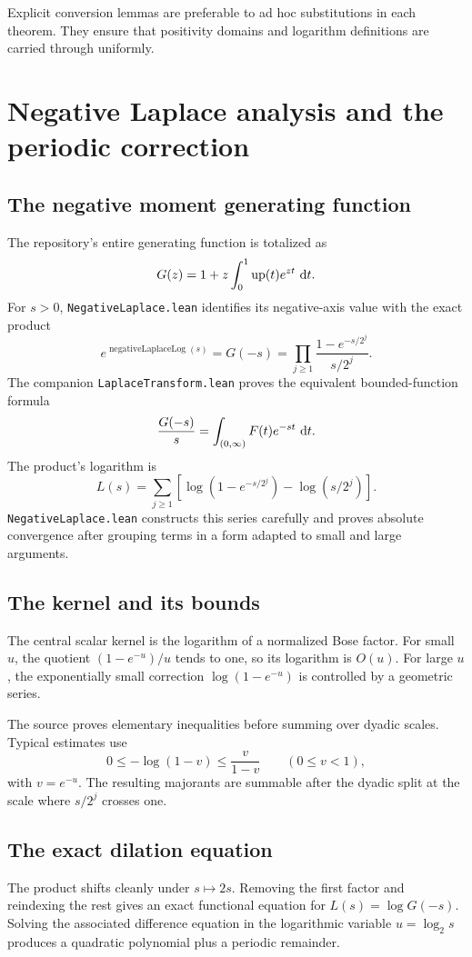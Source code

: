 \documentclass[11pt,oneside]{article}
\theoremstyle{definition}
\theoremstyle{remark}
\begin{document}
Explicit conversion lemmas are preferable to ad hoc substitutions in each theorem.  They ensure that positivity domains and logarithm definitions are carried through uniformly.

\section{Negative Laplace analysis and the periodic correction}\label{ch:negative-laplace}

\subsection{The negative moment generating function}
The repository's entire generating function is totalized as
\[
  G(z)=1+z\int_0^1\operatorname{up}(t)e^{zt}\,\mathop{}\!\mathrm{d} t.
\]
For \(s>0\), \nolinkurl{NegativeLaplace.lean} identifies its negative-axis value with the exact product
\[
  e^{\operatorname{negativeLaplaceLog}(s)}=G(-s)
  =\prod_{j\geq1}
    \frac{1-e^{-s/2^j}}{s/2^j}.
\]
The companion \nolinkurl{LaplaceTransform.lean} proves the equivalent bounded-function formula
\[
  \frac{G(-s)}s=\int_{(0,\infty)}F(t)e^{-st}\,\mathop{}\!\mathrm{d} t.
\]
The product's logarithm is
\[
  L(s)=\sum_{j\geq1}
   \left[\log(1-e^{-s/2^j})-
         \log(s/2^j)\right].
\]
\nolinkurl{NegativeLaplace.lean} constructs this series carefully and proves absolute convergence after grouping terms in a form adapted to small and large arguments.

\subsection{The kernel and its bounds}
The central scalar kernel is the logarithm of a normalized Bose factor.  For small \(u\), the quotient \((1-e^{-u})/u\) tends to one, so its logarithm is \(O(u)\).  For large \(u\), the exponentially small correction \(\log(1-e^{-u})\) is controlled by a geometric series.

The source proves elementary inequalities before summing over dyadic scales.  Typical estimates use
\[
  0\leq-\log(1-v)\leq\frac{v}{1-v}
  \qquad(0\leq v<1),
\]
with \(v=e^{-u}\).  The resulting majorants are summable after the dyadic split at the scale where \(s/2^j\) crosses one.

\subsection{The exact dilation equation}
The product shifts cleanly under \(s\mapsto2s\).  Removing the first factor and reindexing the rest gives an exact functional equation for \(L(s)=\log G(-s)\).  Solving the associated difference equation in the logarithmic variable \(u=\log_2s\) produces a quadratic polynomial plus a periodic remainder.
\end{document}
